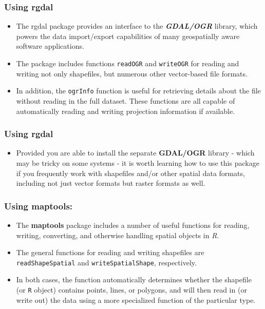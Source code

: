 \documentclass{beamer}
\begin{document}
\begin{frame}
\frametitle{Using rgdal}
\begin{itemize}
\item The rgdal package provides an interface to the \textit{\textbf{GDAL/OGR}} library, which powers the data import/export capabilities of 
many geospatially aware software applications. 
\item The package includes functions \texttt{readOGR} and \texttt{writeOGR} for reading and 
writing not only shapefiles, but numerous other vector-based file formats. 
\item In addition, the \texttt{ogrInfo} function is useful for retrieving details about the file without reading in the full dataset. These functions are all capable of automatically reading and writing projection information if available. 
\end{itemize} 
\end{frame}
\begin{frame}
\frametitle{Using rgdal}
\vspace{-1cm}
\begin{itemize}
\item Provided you are able to install the separate \textbf{GDAL/OGR} library - which may be tricky on some systems - it is worth learning how to use this package if you frequently work with shapefiles and/or other spatial data formats, including not just vector formats but raster formats as well.
\end{itemize}
\end{frame}
\begin{frame}
\frametitle{Using maptools:}
\begin{itemize}
\item The \textbf{maptools} package includes a number of useful functions for reading, writing, converting, and otherwise handling 
spatial objects in \textit{R}. 
\item The general functions for reading and writing shapefiles are \texttt{readShapeSpatial} and \texttt{writeSpatialShape}, respectively. 
\item 
In both cases, the function automatically determines whether the shapefile (or \texttt{R} object) contains points, 
lines, or polygons, and will then read in (or write out) the data using a more specialized function of the particular type. 
\end{itemize}
\end{frame}
\end{document}
